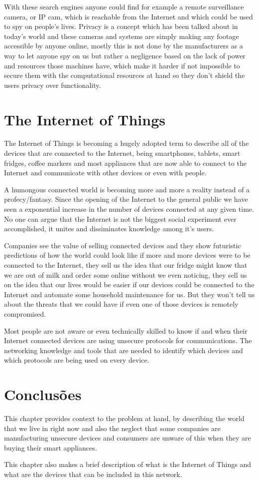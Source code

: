 With these search engines anyone could find for example a remote surveillance
camera, or IP cam, which is reachable from the Internet and which could be used
to spy on people's lives. Privacy is a concept which has been talked about in
today's world and these cameras and systems are simply making any footage
accessible by anyone online, mostly this is not done by the manufacturers as a
way to let anyone spy on us but rather a negligence based on the lack of power
and resources those machines have, which make it harder if not impossible to
secure them with the computational resources at hand so they don't shield the
users privacy over functionality.

\section{The Internet of Things}
\label{chap2:sec:iot}
The Internet of Things is becoming a hugely adopted term to describe all of the
devices that are connected to the Internet, being smartphones, tablets, smart
fridges, coffee markers and most appliances that are now able to connect to the
Internet and communicate with other devices or even with people.

A humongous connected world is becoming more and more a reality instead of a
profecy/fantasy. Since the opening of the Internet to the general public we
have seen a exponential increase in the number of devices connected at any
given time. No one can argue that the Internet is not the biggest social
experiment ever accomplished, it unites and dissiminates knowledge among it's
users.

Companies see the value of selling connected devices and they show futuristic
predictions of how the world could look like if more and more devices were to
be connected to the Internet, they sell us the idea that our fridge might know
that we are out of milk and order some online without we even noticing, they
sell us on the idea that our lives would be easier if our devices could be
connected to the Internet and automate some household maintenance for us. But
they won't tell us about the threats that we could have if even one of those
devices is remotely compromised.

Most people are not aware or even technically skilled to know if and when their
Internet connected devices are using unsecure protocols for communications. The
networking knowledge and tools that are needed to identify which devices and
which protocols are being used on every device.

\section{Conclusões}
\label{chap2:sec:concs}
This chapter provides context to the problem at hand, by describing the world
that we live in right now and also the neglect that some companies are
manufacturing unsecure devices and consumers are unware of this when they are
buying their smart appliances.

This chapter also makes a brief description of what is the Internet of Things
and what are the devices that can be included in this network.
